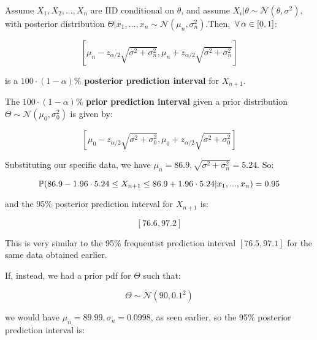 \documentclass[a4paper]{article}
\begin{document}
                \begin{definition}
                    Assume $X_1, X_2, ..., X_n$ are IID conditional on $\theta$,
                    and assume $X_i | \theta \sim \mathcal{N}(\theta, \sigma^2
                    )$, with posterior distribution $\Theta | x_1, ..., x_n \sim
                    \mathcal{N}(\mu_n, \sigma_n^2)$.Then, $\,\forall\, \alpha \in [0,
                    1]$:

                    \[
                        \left[\mu_n - z_{\alpha/2} \sqrt{\sigma^2 + \sigma_n^2},
                        \mu_n + z_{\alpha/2} \sqrt{\sigma^2 + \sigma_n^2}\right]
                    \]

                    is a $100 \cdot (1 - \alpha)\%$ \textbf{posterior prediction
                    interval} for $X_{n + 1}$.

                    The $100 \cdot (1 - \alpha)\%$ \textbf{prior prediction
                    interval} given a prior distribution $\Theta \sim
                    \mathcal{N}(\mu_0, \sigma_0^2)$ is given by:

                    \[
                        \left[\mu_0 - z_{\alpha/2} \sqrt{\sigma^2 + \sigma_0^2},
                        \mu_0 + z_{\alpha/2} \sqrt{\sigma^2 + \sigma_0^2}\right]
                    \]
                \end{definition}

                Substituting our specific data, we have $\mu_n = 86.9, \sqrt{
                \sigma^2 + \sigma_n^2} = 5.24$. So:

                $$
                    \mathbb{P}(86.9 - 1.96 \cdot 5.24 \leq X_{n+1} \leq 86.9 + 1.96
                    \cdot 5.24 | x_1, ..., x_n) = 0.95
                $$

                and the 95\% posterior prediction interval for $X_{n+1}$ is:

                $$
                    [76.6, 97.2]
                $$

                This is very similar to the 95\% frequentist prediction interval
                $[76.5, 97.1]$ for the same data obtained earlier.

                If, instead, we had a prior pdf for $\Theta$ such that:

                $$
                    \Theta \sim \mathcal{N}(90, 0.1^2)
                $$

                we would have $\mu_n = 89.99, \sigma_n = 0.0998$, as seen
                earlier, so the 95\% posterior prediction interval is:
\end{document}
